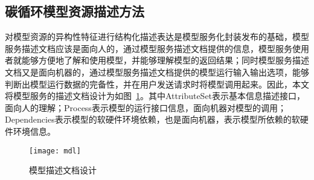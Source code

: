 \subsection{碳循环模型资源描述方法}
\label{sec:ms-desc}
对模型资源的异构性特征进行结构化描述表达是模型服务化封装发布的基础，模型服务描述文档应该是面向人的，通过模型服务描述文档提供的信息，模型服务使用者就能够方便地了解和使用模型，并能够理解模型的返回结果；同时模型服务描述文档又是面向机器的，通过模型服务描述文档提供的模型运行输入输出选项，能够判断出模型运行数据的完备性，并在用户发送请求时将模型调用起来。因此，本文将模型服务的描述文档设计为如图~\ref{fig:mdl}。其中AttributeSet表示基本信息描述接口，面向人的理解；Process表示模型的运行接口信息，面向机器对模型的调用；Dependencies表示模型的软硬件环境依赖，也是面向机器，表示模型所依赖的软硬件环境信息。




\begin{figure}[!htbp]
    \centering
    \texttt{[image: mdl]}
    \caption{模型描述文档设计}
    \label{fig:mdl}
\end{figure}

